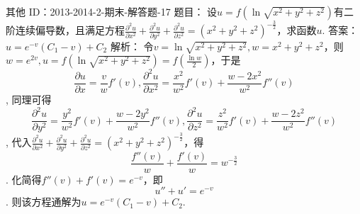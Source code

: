 其他
ID：2013-2014-2-期末-解答题-17
题目：
设$u=f\left( \ln \sqrt{{{x}^{2}}+{{y}^{2}}+{{z}^{2}}} \right)$有二阶连续偏导数，且满足方程$\frac{{{\partial }^{2}}u}{\partial {{x}^{2}}}+\frac{{{\partial }^{2}}u}{\partial {{y}^{2}}}+\frac{{{\partial }^{2}}u}{\partial {{z}^{2}}}={{\left( {{x}^{2}}+{{y}^{2}}+{{z}^{2}} \right)}^{-\frac{3}{2}}}$，求函数$u$.
答案：$u={{e}^{-v}}\left( {{C}_{1}}-v \right)+{{C}_{2}}$
解析：
令$v=\ln \sqrt{{{x}^{2}}+{{y}^{2}}+{{z}^{2}}},w={{x}^{2}}+{{y}^{2}}+{{z}^{2}}$，则$w={{e}^{2v}},u=f\left( \ln \sqrt{{{x}^{2}}+{{y}^{2}}+{{z}^{2}}} \right)=f\left( \frac{\ln w}{2} \right)$，于是
	\[\frac{\partial u}{\partial x}=\frac{v}{w}{f}'\left( v \right),\frac{{{\partial }^{2}}u}{\partial {{x}^{2}}}=\frac{{{x}^{2}}}{{{w}^{2}}}{f}'\left( v \right)+\frac{w-2{{x}^{2}}}{{{w}^{2}}}{f}''\left( v \right)\],
同理可得
	\[\frac{{{\partial }^{2}}u}{\partial {{y}^{2}}}=\frac{{{y}^{2}}}{{{w}^{2}}}{f}'\left( v \right)+\frac{w-2{{y}^{2}}}{{{w}^{2}}}{f}''\left( v \right),\frac{{{\partial }^{2}}u}{\partial {{z}^{2}}}=\frac{{{z}^{2}}}{{{w}^{2}}}{f}'\left( v \right)+\frac{w-2{{z}^{2}}}{{{w}^{2}}}{f}''\left( v \right)\],
代入$\frac{{{\partial }^{2}}u}{\partial {{x}^{2}}}+\frac{{{\partial }^{2}}u}{\partial {{y}^{2}}}+\frac{{{\partial }^{2}}u}{\partial {{z}^{2}}}={{\left( {{x}^{2}}+{{y}^{2}}+{{z}^{2}} \right)}^{-\frac{3}{2}}}$，得\[\frac{{f}''\left( v \right)}{w}+\frac{{f}'\left( v \right)}{w}={{w}^{-\frac{3}{2}}}\]. 化简得${f}''\left( v \right)+{f}'\left( v \right)={{e}^{-v}}$，即\[{u}''+{u}'={{e}^{-v}}\].
则该方程通解为$u={{e}^{-v}}\left( {{C}_{1}}-v \right)+{{C}_{2}}$.
